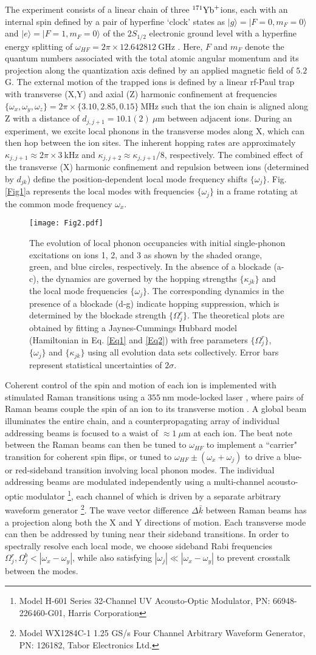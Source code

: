 \documentclass[groupaddress,9pt,twocolumn,superscriptaddress, aps, prl]{revtex4-1}
\newcommand{\ket}[1]{|#1\rangle}
\newcommand{\Yb}{$^{171}{\rm{Yb}}^{+} $}
\newcommand{\FigureTwo}{
\begin{figure*}
\begin{center}
\texttt{[image: Fig2.pdf]}
\end{center}
\renewcommand{\baselinestretch}{1}
\small\normalsize
\caption{ The evolution of local phonon occupancies with initial single-phonon excitations on ions 1, 2, and 3 as shown by the shaded orange, green, and blue circles, respectively. In the absence of a blockade (a-c), the dynamics are governed by the hopping strengths $\{\kappa_{jk}\}$ and the local mode frequencies $\{\omega_j\}$. The corresponding dynamics in the presence of a blockade (d-g) indicate hopping suppression, which is determined by the  blockade strength $\{\Omega^r_j\}$. The theoretical plots are obtained by fitting a Jaynes-Cummings Hubbard model (Hamiltonian in Eq. \ref{Eq1} and \ref{Eq2}) with free parameters $\{\Omega^r_j\}$, $\{\omega_j\}$ and $\{\kappa_{jk}\}$ using all evolution data sets collectively. Error bars represent statistical uncertainties of $2\sigma$.}
\label{Fig2}
\end{figure*}}
\begin{document}
The experiment consists of a linear chain of three \Yb ions, each with an internal spin defined by a pair of hyperfine `clock' states as $\ket{g}=\ket{F=0,m_F=0}$ and $\ket{e}=\ket{F=1,m_F=0}$ of the $2S_{1/2}$ electronic ground level with a hyperfine energy splitting of $\omega_{HF}=2\pi\times12.642812\:$GHz \cite{Olmschenk2007}. Here, $F$ and $m_F$ denote the quantum numbers associated with the total atomic angular momentum and its projection along the quantization axis defined by an applied magnetic field of $5.2\:$G. The external motion of the trapped ions is defined by a linear rf-Paul trap with transverse (X,Y) and axial (Z) harmonic confinement at frequencies $\{ \omega_x,\omega_y,\omega_z \}=2\pi\times\{3.10,2.85,0.15\}\:$MHz such that the ion chain is aligned along Z with a distance of $d_{j,j+1}=10.1(2)\:\mu$m between adjacent ions. During an experiment, we excite local phonons in the transverse modes along X, which can then hop between the ion sites. The inherent hopping rates are approximately $\kappa_{j,j+1}\approx2\pi\times3\:$kHz and $\kappa_{j,j+2}\approx\kappa_{j,j+1}/8$, respectively. The combined effect of the transverse (X) harmonic confinement and repulsion between ions (determined by $d_{jk}$) define the position-dependent local mode frequency shifts $\{\omega_j\}$. Fig. \ref{Fig1}a represents the local modes with frequencies $\{\omega_j\}$ in a frame rotating at the common mode frequency $\omega_x$. 

\FigureTwo

Coherent control of the spin and motion of each ion is implemented with stimulated Raman transitions using a $355\:$nm mode-locked laser \cite{Hayes2010}, where pairs of Raman beams couple the spin of an ion to its transverse motion \cite{Debnath2016}. A global beam illuminates the entire chain, and a counterpropagating array of individual addressing beams is focused to a waist of $\approx 1\:\mu$m at each ion. The beat note between the Raman beams can then be tuned to $\omega_{HF}$ to implement a ``carrier" transition for coherent spin flips, or tuned to $\omega_{HF}\pm(\omega_x+\omega_j)$ to drive a blue- or red-sideband transition involving local phonon modes. The individual addressing beams are modulated independently using a multi-channel acousto-optic modulator \footnote{Model H-601 Series 32-Channel UV Acousto-Optic Modulator, PN: 66948-226460-G01, Harris Corporation}, each channel of which is driven by a separate arbitrary waveform generator \footnote{Model WX1284C-1 1.25 GS/s Four Channel Arbitrary Waveform Generator, PN: 126182, Tabor Electronics Ltd.}. The wave vector difference $\Delta\bar{k}$ between Raman beams has a projection along both the X and Y directions of motion. Each transverse mode can then be addressed by tuning near their sideband transitions. In order to spectrally resolve each local mode, we choose sideband Rabi frequencies $\Omega^r_j,\Omega^b_j<|\omega_x-\omega_y|$, while also satisfying $|\omega_j|\ll |\omega_x-\omega_y|$ to prevent crosstalk between the modes.
\end{document}
